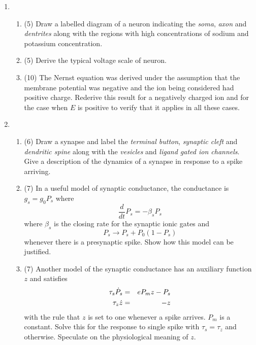 \documentclass[12pt]{article}
\begin{document}
\begin{enumerate} %

\item %
\begin{enumerate}
\item (5) Draw a labelled diagram of a neuron indicating the {\sl soma},
  {\sl axon} and {\sl dentrites} along with the regions with high concentrations
  of sodium and potassium concentration.
\item (5) Derive the typical voltage scale of neuron.
\item (10) The Nernst equation was derived under the assumption that the
  membrane potential was negative and the ion being considered had
  positive charge. Rederive this result for a negatively charged ion
  and for the case when $E$ is positive to verify that it applies in
  all these cases.
\end{enumerate}

\vfill

\item %
\begin{enumerate}
\item (6) Draw a synapse and label the {\sl terminal button}, {\sl synaptic cleft} and {\sl dendritic spine} along with the {\sl vesicles} and {\sl ligand gated ion channels}. Give a description of the dynamics of a synapse in response to a spike arriving.
\item (7) In a useful model of synaptic conductance, the conductance is $g_s=g_0P_s$ where 
\begin{equation}
\frac{d}{dt}P_s=-\beta_sP_s
\end{equation}
where $\beta_s$ is the closing rate for the synaptic ionic gates and
\begin{equation}
P_s\rightarrow P_s+P_0(1-P_s)
\end{equation}
whenever there is a presynaptic spike. Show how this model can be justified. 
\item (7) Another model of the synaptic conductance has an auxiliary function $z$ and satisfies
\begin{eqnarray}
\tau_s\dot{P}_s&=&eP_mz-P_s\cr
\tau_z\dot{z}&=&-z
\end{eqnarray}
with the rule that $z$ is set to one whenever a spike arrives. $P_m$
is a constant. Solve this for the response to single spike with
$\tau_s=\tau_z$ and otherwise. Speculate on the physiological meaning
of $z$.

\vfill


\end{enumerate}
\end{enumerate}
\end{document}
